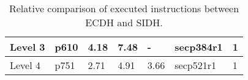 \begin{table}[H]
\begin{tabular}{|K{1.8cm}|K{1.8cm}|K{1.8cm}|K{2cm}|K{1.8cm}|K{1.8cm}|K{1.8cm}|}
\hline
{}Level 3                                                                                                                                                & {}p610                                                                   & 4.18                 & 7.48                                                                                                        & -              & {}secp384r1                                                              & {}1  \\ 
\hline
{}Level 4                                                                                                                                                & {}p751                                                                   & 2.71                 & 4.91                                                                                                        & 3.66           & {}secp521r1                                                              & {}1  \\
\hline
\end{tabular}
\caption[Comparing executed instructions between \gls{ECDH} and \gls{SIDH}]{Relative comparison of executed instructions between \gls{ECDH} and \gls{SIDH}.}
\label{tab:conclusion_ecdh_sidh}
\end{table}

